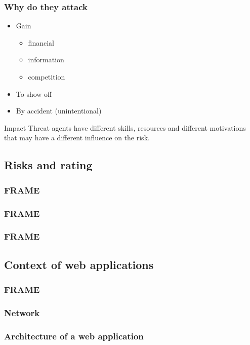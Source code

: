 \begin{frame}
\frametitle{Why do they attack}
\begin{itemize}
\item Gain
	\begin{itemize}
	\item financial
	\item information
	\item competition
	\end{itemize}
\item To show off
\item By accident (unintentional)
\end{itemize}
\begin{block}{Impact}
Threat agents have different skills, resources and different motivations that
may have a different influence on the risk.
\end{block}
\end{frame}

\subsection{Risks and rating}

\begin{frame}
\frametitle{FRAME}
\end{frame}

\begin{frame}
\frametitle{FRAME}
\end{frame}

\begin{frame}
\frametitle{FRAME}
\end{frame}

\subsection{Context of web applications}

\begin{frame}
\frametitle{FRAME}
\end{frame}

\subsubsection{Network}
\subsubsection{Architecture of a web application}
